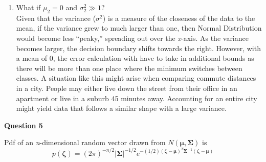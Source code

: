\documentclass[12pt,A4]{article}
\begin{document}
\begin{enumerate}
    \item What if $\mu_2 = 0$ and $\sigma_2^2\gg 1$? \\
    Given that the variance ($\sigma^2$) is a measure of the closeness of the data to the mean, if the variance grew to much larger than one, then Normal Distribution would become less ``peaky,'' spreading out over the \textit{x}-axis. As the variance becomes larger, the decision boundary shifts towards the right. However, with a mean of 0, the error calculation with have to take in additional bounds as there will be more than one place where the minimum switches between classes. A situation like this might arise when comparing commute distances in a city. People may either live down the street from their office in an apartment or live in a suburb 45 minutes away. Accounting for an entire city might yield data that follows a similar shape with a large variance.
\end{enumerate}

\textbf{Question 5}

\newcommand{\mbold}[1]{\boldsymbol{\mathrm{#1}}}
Pdf of an \textit{n}-dimensional random vector drawn from $N(\boldsymbol{\mu}, \boldsymbol{\Sigma})$ is
$$p(\boldsymbol{\zeta}) = (2\pi)^{-n/2}|\boldsymbol{\Sigma}|^{-1/2}e^{-(1/2)(\boldsymbol{\zeta}-\boldsymbol{\mu})^T\boldsymbol{\Sigma}^{-1}(\boldsymbol{\zeta} - \boldsymbol{\mu})}$$
\end{document}
